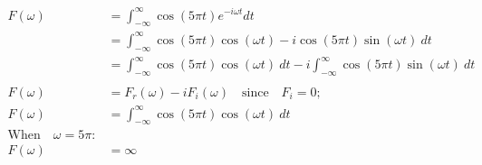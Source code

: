 \documentclass[preview]{standalone}
\begin{document}
\begin{align*}
F(\omega)&= \int_{-\infty}^{\infty} \cos{(5\pi t)}e^{-i\omega t} dt \\ &= \int_{-\infty}^{\infty} \cos{(5\pi t)}\cos{(\omega t)}-i\cos{(5\pi t)}\sin{(\omega t)} \ dt \\ &=\int_{-\infty}^{\infty} \cos{(5\pi t)}\cos{(\omega t)} \ dt - i\int_{-\infty}^{\infty} \cos{(5\pi t)}\sin{(\omega t)} \ dt \\ \\ F(\omega)&=F_{r}(\omega)-iF_{i}(\omega) \quad \textrm{since} \quad F_{i}=0; \\  F(\omega)&=\int_{-\infty}^{\infty} \cos{(5\pi t)}\cos{(\omega t)} \ dt \\  \textrm{When} \quad \omega=5\pi : \\ F(\omega)&=\infty
\end{align*}
\end{document}
